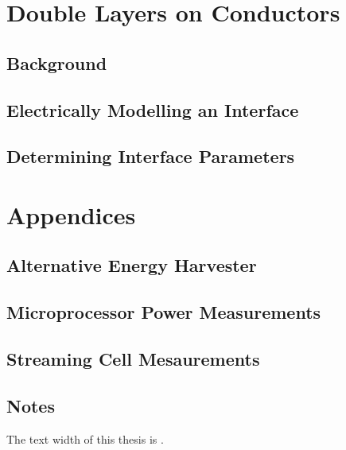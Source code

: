 \part{\label{part:doubleLayersOnConductors}Double Layers on Conductors}
    \chapter{Background}
    \chapter{Electrically Modelling an Interface}
        
    \chapter{Determining Interface Parameters}
        

\part{Appendices}
    \appendix
    \chapter{Alternative Energy Harvester}
        
    \chapter{Microprocessor Power Measurements}
        
    \chapter{Streaming Cell Mesaurements}
        

\chapter*{Notes}
The text width of this thesis is \the\textwidth.







